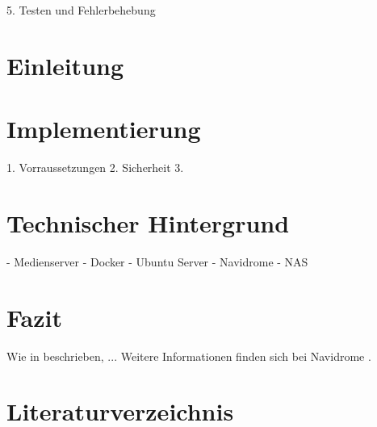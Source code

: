 \documentclass[12pt,a4paper]{article}
\begin{document}
5. Testen und Fehlerbehebung

\section{Einleitung}

\section{Implementierung}
1. Vorraussetzungen
2. Sicherheit
3. 

\section{Technischer Hintergrund}
- Medienserver
- Docker
- Ubuntu Server
- Navidrome
- NAS

\section{Fazit}


Wie in \textcite{kuster2005musikinformatik} beschrieben, ...
Weitere Informationen finden sich bei Navidrome \parencite{navidrome2024}.

\section{Literaturverzeichnis}

\printbibliography
\end{document}
